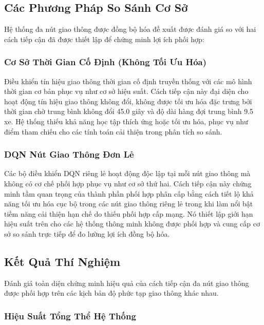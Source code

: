 \subsection{Các Phương Pháp So Sánh Cơ Sở}\label{subsec2b-3}

Hệ thống đa nút giao thông được đồng bộ hóa đề xuất được đánh giá so với hai cách tiếp cận đã được thiết lập 
để chứng minh lợi ích phối hợp:

\subsubsection{Cơ Sở Thời Gian Cố Định (Không Tối Ưu Hóa)}

Điều khiển tín hiệu giao thông thời gian cố định truyền thống với các mô hình thời gian cơ bản phục vụ 
như cơ sở hiệu suất. Cách tiếp cận này đại diện cho hoạt động tín hiệu giao thông không đổi, không được 
tối ưu hóa đặc trưng bởi thời gian chờ trung bình không đổi 45.0 giây và độ dài hàng đợi trung bình 9.5 xe. 
Hệ thống thiếu khả năng học tập thích ứng hoặc tối ưu hóa, phục vụ như điểm tham chiếu cho các tính toán 
cải thiện trong phân tích so sánh.

\subsubsection{DQN Nút Giao Thông Đơn Lẻ}

Các bộ điều khiển DQN riêng lẻ hoạt động độc lập tại mỗi nút giao thông mà không có cơ chế phối hợp 
phục vụ như cơ sở thứ hai. Cách tiếp cận này chứng minh tầm quan trọng của thành phần phối hợp phân cấp 
bằng cách tiết lộ khả năng tối ưu hóa cục bộ trong các nút giao thông riêng lẻ trong khi làm nổi bật 
tiềm năng cải thiện hạn chế do thiếu phối hợp cấp mạng. Nó thiết lập giới hạn hiệu suất trên cho các hệ thống 
thông minh không được phối hợp và cung cấp cơ sở so sánh trực tiếp để đo lường lợi ích đồng bộ hóa.

\subsection{Kết Quả Thí Nghiệm}\label{subsec2b-4}

Đánh giá toàn diện chứng minh hiệu quả của cách tiếp cận đa nút giao thông được phối hợp trên các kịch bản 
độ phức tạp giao thông khác nhau.

\subsubsection{Hiệu Suất Tổng Thể Hệ Thống}


